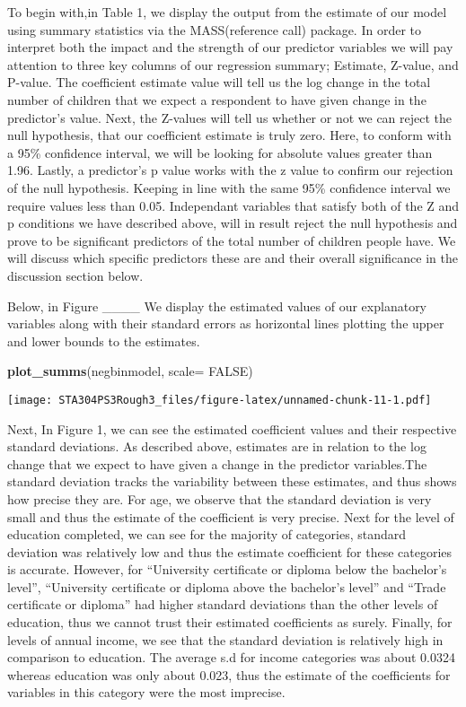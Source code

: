 \documentclass[
]{article}
\newenvironment{Shaded}{\begin{snugshade}}{\end{snugshade}}
\newcommand{\DataTypeTok}[1]{\textcolor[rgb]{0.13,0.29,0.53}{#1}}
\newcommand{\KeywordTok}[1]{\textcolor[rgb]{0.13,0.29,0.53}{\textbf{#1}}}
\newcommand{\NormalTok}[1]{#1}
\newcommand{\OtherTok}[1]{\textcolor[rgb]{0.56,0.35,0.01}{#1}}
\begin{document}
To begin with,in Table 1, we display the output from the estimate of our
model using summary statistics via the MASS(reference call) package. In
order to interpret both the impact and the strength of our predictor
variables we will pay attention to three key columns of our regression
summary; Estimate, Z-value, and P-value. The coefficient estimate value
will tell us the log change in the total number of children that we
expect a respondent to have given change in the predictor's value. Next,
the Z-values will tell us whether or not we can reject the null
hypothesis, that our coefficient estimate is truly zero. Here, to
conform with a 95\% confidence interval, we will be looking for absolute
values greater than 1.96. Lastly, a predictor's p value works with the z
value to confirm our rejection of the null hypothesis. Keeping in line
with the same 95\% confidence interval we require values less than 0.05.
Independant variables that satisfy both of the Z and p conditions we
have described above, will in result reject the null hypothesis and
prove to be significant predictors of the total number of children
people have. We will discuss which specific predictors these are and
their overall significance in the discussion section below.

Below, in Figure \_\_\_\_ We display the estimated values of our
explanatory variables along with their standard errors as horizontal
lines plotting the upper and lower bounds to the estimates.

\begin{Shaded}
\begin{Highlighting}[]
\KeywordTok{plot_summs}\NormalTok{(negbinmodel, }\DataTypeTok{scale=} \OtherTok{FALSE}\NormalTok{)}
\end{Highlighting}
\end{Shaded}

\texttt{[image: STA304PS3Rough3\_files/figure-latex/unnamed-chunk-11-1.pdf]}

Next, In Figure 1, we can see the estimated coefficient values and their
respective standard deviations. As described above, estimates are in
relation to the log change that we expect to have given a change in the
predictor variables.The standard deviation tracks the variability
between these estimates, and thus shows how precise they are. For age,
we observe that the standard deviation is very small and thus the
estimate of the coefficient is very precise. Next for the level of
education completed, we can see for the majority of categories, standard
deviation was relatively low and thus the estimate coefficient for these
categories is accurate. However, for ``University certificate or diploma
below the bachelor's level'', ``University certificate or diploma above
the bachelor's level'' and ``Trade certificate or diploma'' had higher
standard deviations than the other levels of education, thus we cannot
trust their estimated coefficients as surely. Finally, for levels of
annual income, we see that the standard deviation is relatively high in
comparison to education. The average s.d for income categories was about
0.0324 whereas education was only about 0.023, thus the estimate of the
coefficients for variables in this category were the most imprecise.
\end{document}
